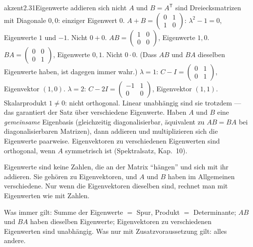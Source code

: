 \begin{loesungkarte}{akzent}{2.31}{Eigenwerte addieren sich nicht}
$A$ und $B = A^{\mathsf T}$ sind Dreiecksmatrizen mit Diagonale $0, 0$: einziger Eigenwert $0$. $A + B = \begin{pmatrix}0 & 1\\ 1 & 0\end{pmatrix}$: $\lambda^{2} - 1 = 0$, Eigenwerte $1$ und $-1$. Nicht $0 + 0$.
$AB = \begin{pmatrix}1 & 0\\ 0 & 0\end{pmatrix}$, Eigenwerte $1, 0$. $BA = \begin{pmatrix}0 & 0\\ 0 & 1\end{pmatrix}$, Eigenwerte $0, 1$. Nicht $0\cdot0$. (Dass $AB$ und $BA$ dieselben Eigenwerte haben, ist dagegen immer wahr.)
$\lambda = 1$: $C - I = \begin{pmatrix}0 & 1\\ 0 & 1\end{pmatrix}$, Eigenvektor $(1, 0)$. $\lambda = 2$: $C - 2I = \begin{pmatrix}-1 & 1\\ 0 & 0\end{pmatrix}$, Eigenvektor $(1, 1)$. Skalarprodukt $1\neq0$: nicht orthogonal. Linear unabhängig sind sie trotzdem --- das garantiert der Satz über verschiedene Eigenwerte.
Haben $A$ und $B$ eine \emph{gemeinsame} Eigenbasis (gleichzeitig diagonalisierbar, äquivalent zu $AB = BA$ bei diagonalisierbaren Matrizen), dann addieren und multiplizieren sich die Eigenwerte paarweise. Eigenvektoren zu verschiedenen Eigenwerten sind orthogonal, wenn $A$ symmetrisch ist (Spektralsatz, Kap.\ 10).
\begin{fehler}\kastentext
Eigenwerte sind keine Zahlen, die an der Matrix \enquote{hängen} und sich mit ihr addieren. Sie gehören zu Eigenvektoren, und $A$ und $B$ haben im Allgemeinen verschiedene. Nur wenn die Eigenvektoren dieselben sind, rechnet man mit Eigenwerten wie mit Zahlen.
\end{fehler}
\begin{mitnehmen}\kastentext
Was immer gilt: Summe der Eigenwerte $=$ Spur, Produkt $=$ Determinante; $AB$ und $BA$ haben dieselben Eigenwerte; Eigenvektoren zu verschiedenen Eigenwerten sind unabhängig. Was nur mit Zusatzvoraussetzung gilt: alles andere.
\end{mitnehmen}
\end{loesungkarte}

